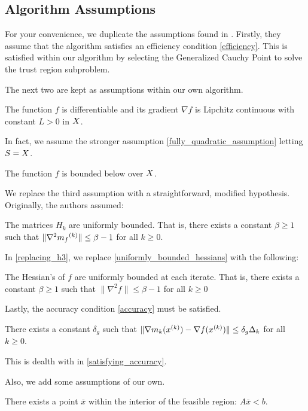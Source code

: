 \subsection{Algorithm Assumptions}
For your convenience, we duplicate the assumptions found in \cite{doi:10.1080/10556788.2015.1026968}.
Firstly, they assume that the algorithm satisfies an efficiency condition \cref{efficiency}.
This is satisfied within our algorithm by selecting the Generalized Cauchy Point \cite{Conn:2000:TM:357813} to solve the trust region subproblem.

The next two are kept as assumptions within our own algorithm.
\begin{assumption}
\label{lipschitz}
The function $f$ is differentiable and its gradient $\nabla f$ is Lipchitz continuous with constant $L > 0$ in $X$.
\end{assumption}
In fact, we assume the stronger assumption \cref{fully_quadratic_assumption} letting $S = X$.


\begin{assumption}
\label{lower_bound}
The function $f$ is bounded below over $X$.
\end{assumption}


We replace the third assumption with a straightforward, modified hypothesis.
Originally, the authors assumed:
\begin{assumption}
\label{uniformly_bounded_hessians}
The matrices $H_k$ are uniformly bounded. That is, there exists a constant $\beta \ge 1$ such that $\|\nabla^2 {{m}_f}^{(k)}\| \le \beta - 1$ for all $k \ge 0$.
\end{assumption}
In \cref{replacing_h3}, we replace \cref{uniformly_bounded_hessians} with the following:
\begin{assumption}
\label{other_uniformly_bounded_hessians}
The Hessian's of $f$ are uniformly bounded at each iterate. That is, there exists a constant $\beta \ge 1$ such that $\|\nabla^2 f\| \le \beta - 1$ for all $k \ge 0$
\end{assumption}

Lastly, the accuracy condition \cref{accuracy} must be satisfied.
\begin{assumption}
\label{accuracy_assumption}
There exists a constant $\delta_g$ such that $\|\nabla m_k({x^{(k)}}) - \nabla f({x^{(k)}})\| \le \delta_g \Delta_k$ for all $k \ge 0$.
\end{assumption}
This is dealth with in \cref{satisfying_accuracy}.


Also, we add some assumptions of our own.
\begin{assumption}
\label{interior_point}
There exists a point $\bar x$ within the interior of the feasible region: $A\bar x < b$.
\end{assumption}


